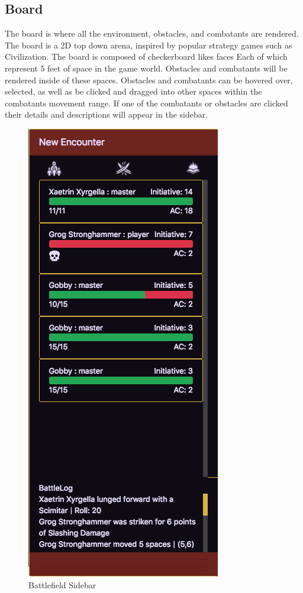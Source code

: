 \documentclass[12pt,a4paper]{report}
\begin{document}
\subsection {Board}
The board is where all the environment, obstacles, and combatants are rendered. The board is a 2D top down arena, inspired by popular strategy games such as Civilization. The board is composed of checkerboard likes faces Each of which represent 5 feet of space in the game world. Obstacles and combatants will be rendered inside of these spaces. Obstacles and combatants can be hovered over, selected, as well as be clicked and dragged into other spaces within the combatants movement range. If one of the combatants or obstacles are clicked their details and descriptions will appear in the sidebar. 
\begin{figure}[H]
	\centering
	\includegraphics[scale=.5]{encountercreatorsidebar}
	\caption{Battlefield Sidebar}
	\label{fig: Battlefield Sidebar}
\end{figure}
\end{document}
